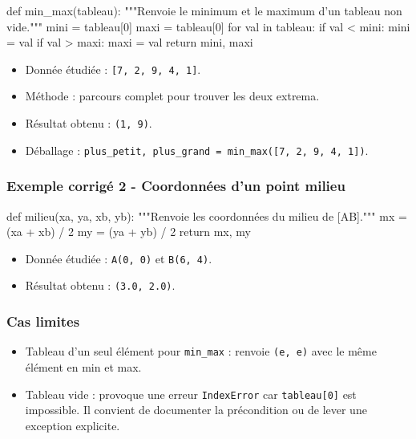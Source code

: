 \begin{python}
def min_max(tableau):
    """Renvoie le minimum et le maximum d'un tableau non vide."""
    mini = tableau[0]
    maxi = tableau[0]
    for val in tableau:
        if val < mini:
            mini = val
        if val > maxi:
            maxi = val
    return mini, maxi
\end{python}

\begin{itemize}
\tightlist
\item
  Donnée étudiée : \texttt{{[}7,\ 2,\ 9,\ 4,\ 1{]}}.
\item
  Méthode : parcours complet pour trouver les deux extrema.
\item
  Résultat obtenu : \texttt{(1,\ 9)}.
\item
  Déballage :
  \texttt{plus\_petit,\ plus\_grand\ =\ min\_max({[}7,\ 2,\ 9,\ 4,\ 1{]})}.
\end{itemize}

\subsubsection{Exemple corrigé 2 - Coordonnées d’un point milieu}

\begin{python}
def milieu(xa, ya, xb, yb):
    """Renvoie les coordonnées du milieu de [AB]."""
    mx = (xa + xb) / 2
    my = (ya + yb) / 2
    return mx, my
\end{python}

\begin{itemize}
\tightlist
\item
  Donnée étudiée : \texttt{A(0,\ 0)} et \texttt{B(6,\ 4)}.
\item
  Résultat obtenu : \texttt{(3.0,\ 2.0)}.
\end{itemize}

\subsubsection{Cas limites}

\begin{itemize}
\tightlist
\item
  Tableau d'un seul élément pour \texttt{min\_max} : renvoie
  \texttt{(e,\ e)} avec le même élément en min et max.
\item
  Tableau vide : provoque une erreur \texttt{IndexError} car
  \texttt{tableau{[}0{]}} est impossible. Il convient de documenter la
  précondition ou de lever une exception explicite.
\end{itemize}

